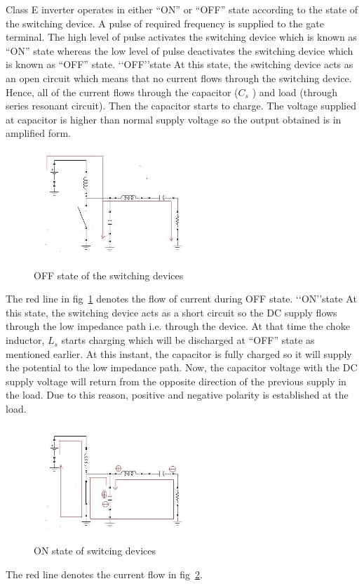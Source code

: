 \documentclass[journal,twoside]{IEEEtran}
\begin{document}
Class E inverter operates in either “ON” or “OFF” state
according to the state of the switching device. A pulse of
required frequency is supplied to the gate terminal. The high
level of pulse activates the switching device which is known
as “ON” state whereas the low level of pulse deactivates the
switching device which is known as “OFF” state.
\lq\lq OFF\rq\rq state
At this state, the switching device acts as an open circuit
which means that no current flows through the switching
device. Hence, all of the current flows through the capacitor
($C_s$ ) and load (through series resonant circuit). Then the
capacitor starts to charge. The voltage supplied at capacitor is higher than normal supply voltage so the output obtained is in
amplified form.\\
\begin{figure}[!ht]
\centering
\includegraphics[width=2.5in]{2}
\caption{OFF state of the switching devices}
\label{fig_2}
\end{figure}

The red line in fig~\ref{fig_2} denotes the flow of current during OFF
state.
\lq\lq ON\rq\rq state
At this state, the switching device acts as a short circuit so the
DC supply flows through the low impedance path i.e. through
the device. At that time the choke inductor, $L_s$ starts charging
which will be discharged at “OFF” state as mentioned earlier.
At this instant, the capacitor is fully charged so it will supply
the potential to the low impedance path. Now, the capacitor
voltage with the DC supply voltage will return from the
opposite direction of the previous supply in the load. Due to
this reason, positive and negative polarity is established at the
load.


\begin{figure}[!ht]
\centering
\includegraphics[width=2.5in]{3}
\caption{ON state of switcing devices}
\label{fig_3}
\end{figure}
The red line denotes the current flow in fig~\ref{fig_3}.
\end{document}
